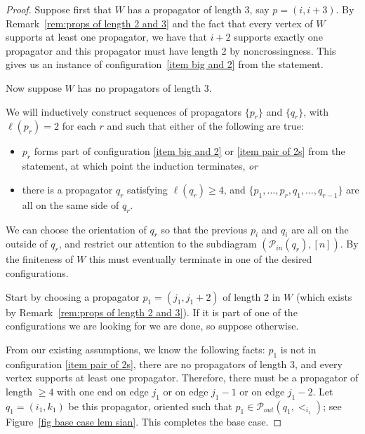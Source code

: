 \documentclass[11pt]{article}
\newcommand{\cP}{\mathcal{P}}
\theoremstyle{remark}
\theoremstyle{definition}
\begin{document}
\begin{proof}
Suppose first that $W$ has a propagator of length $3$, say $p=(i, i+3)$.  By Remark~\ref{rem:props of length 2 and 3} and the fact that every vertex of $W$ supports at least one propagator, we have that $i+2$ supports exactly one propagator and this propagator must have length 2 by noncrossingness.  This gives us an instance of configuration~\ref{item big and 2} from the statement.

Now suppose $W$ has no propagators of length $3$.
  
We will inductively construct sequences of propagators $\{p_r\}$ and $\{q_r\}$, with $\ell(p_r) = 2$ for each $r$ and such that either of the following are true:
\begin{itemize}
\item $p_r$ forms part of configuration \ref{item big and 2} or \ref{item pair of 2s} from the statement, at which point the induction terminates, 
{\em or} 
\item there is a propagator $q_r$ satisfying $\ell(q_r) \geq 4$, and $\{p_1, \ldots, p_r, q_1, \ldots, q_{r-1}\}$ are all on the same side of $q_r$.  
\end{itemize}

We can choose the orientation of $q_r$ so that the previous $p_i$ and $q_i$ are all on the outside of $q_r$, and restrict our attention to the subdiagram $(\cP_{in}(q_r),[n])$. By the finiteness of $W$ this must eventually terminate in one of the desired configurations. %


Start by choosing a propagator $p_1 = (j_1,j_1+2)$ of length 2 in $W$ (which exists by Remark~\ref{rem:props of length 2 and 3}).  If it is part of one of the configurations we are looking for we are done, 
so suppose otherwise. 

From our existing assumptions, we know the following facts: $p_1$ is not in configuration \ref{item pair of 2s}, there are no propagators of length $3$, and every vertex supports at least one propagator.  Therefore, there must be a propagator of length $\geq 4$ with one end on edge $j_1$ or on edge $j_1-1$ or on edge $j_1-2$.  Let $q_1 = (i_1, k_1)$ be this propagator, oriented such that $p_1 \in \cP_{out}(q_1,<_{i_1})$; see Figure~\ref{fig base case lem sian}. This completes the base case.


\end{proof}
\end{document}
